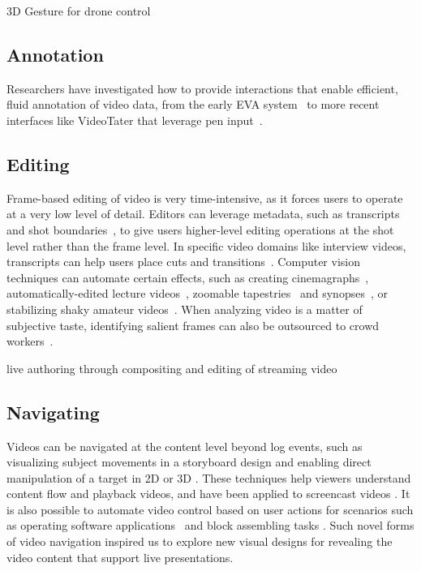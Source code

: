 3D Gesture for drone control~\cite{Cauchard:2015:DME:2750858.2805823,Pfeil:2013:EGM:2449396.2449429}


\subsection{Annotation}
Researchers have investigated how to provide interactions that enable efficient, fluid annotation of video data, from the early EVA system~\cite{Mackay:1989} to more recent interfaces like VideoTater that leverage pen input~\cite{Diakopoulos:2006vt}.


\subsection{Editing}
Frame-based editing of video is very time-intensive, as it forces users to operate at a very low level of detail. Editors can leverage metadata, such as transcripts~\cite{Berthouzoz:2012,Pavel:2014:VDB:2642918.2647400} and shot boundaries~\cite{Casares:2002dx}, to give users higher-level editing operations at the shot level rather than the frame level.
In specific video domains like interview videos, transcripts can help users place cuts and transitions~\cite{Berthouzoz:2012}.
%
Computer vision techniques can automate certain effects, such as creating cinemagraphs~\cite{Bai:2012, Joshi:2012}, automatically-edited lecture videos~\cite{Heck:2007}, zoomable tapestries~\cite{Barnes:2010} and synopses~\cite{Pritch:2009vl}, or stabilizing shaky amateur videos~\cite{Liu:2011}. When analyzing video is a matter of subjective taste, identifying salient frames can also be outsourced to crowd workers~\cite{Bernstein:2011uj}.

live authoring through compositing and editing of streaming video~\cite{Freeman:2014:LLA:2611105.2557304}


\subsection{Navigating}
Videos can be navigated at the content level beyond log events, such as visualizing subject movements in a storyboard design \cite{goldman2006schematic} and enabling direct manipulation of a target in 2D \cite{Dragicevic:2008:VBD:1357054.1357096,Goldman:2008:VOA:1449715.1449719,Karrer:2008:DDM:1357054.1357097} or 3D \cite{Nguyen:2013:DMV:2470654.2466150}. These techniques help viewers understand content flow and playback videos, and have been applied to screencast videos \cite{Denoue:2013:RDM:2451176.2451190}. It is also possible to automate video control based on user actions for scenarios such as operating software applications~\cite{Pongnumkul:2011ju} and block assembling tasks \cite{Gupta:2012ku}. Such novel forms of video navigation inspired us to explore new visual designs for revealing the video content that support live presentations.

